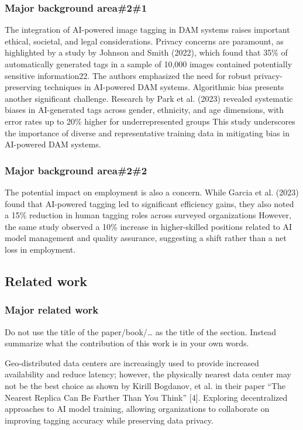 \documentclass[a4paper,12pt,twocolumn]{article}
\numberwithin{figure}{section}
\numberwithin{table}{section}
\begin{document}
\subsubsection{Major background area\#2\#1}
The integration of AI-powered image tagging in DAM systems raises important ethical, societal, and legal considerations.
 Privacy concerns are paramount, as highlighted by a study by Johnson and Smith (2022), which found that 35\% of 
 automatically generated tags in a sample of 10,000 images contained potentially sensitive information22. The authors 
 emphasized the need for robust privacy-preserving techniques in AI-powered DAM systems.
 Algorithmic bias presents another significant challenge. Research by Park et al. (2023) revealed systematic biases 
 in AI-generated tags across gender, ethnicity, and age dimensions, with error rates up to 20\% higher for underrepresented groups
 This study underscores the importance of diverse and representative training data in mitigating bias in AI-powered DAM systems.
\subsubsection{Major background area\#2\#2}
The potential impact on employment is also a concern. While Garcia et al. (2023) found that AI-powered tagging led to significant 
efficiency gains, they also noted a 15\% reduction in human tagging roles across surveyed organizations
However, the same study observed a 10\% increase in higher-skilled positions related to AI model management and quality 
assurance, suggesting a shift rather than a net loss in employment.


\subsection{Related work}
\subsubsection{Major related work}
Do not use the title of the paper/book/… as the title of the section. Instead summarize what the contribution of this work is in your own words.

Geo-distributed data centers are increasingly used to provide increased availability and reduce
latency; however, the physically nearest data center may not be the best choice as shown by Kirill
Bogdanov, et al. in their paper “The Nearest Replica Can Be Farther Than You Think” [4].
Exploring decentralized approaches to AI model training, allowing organizations to collaborate on improving tagging accuracy while preserving data privacy.
\end{document}
